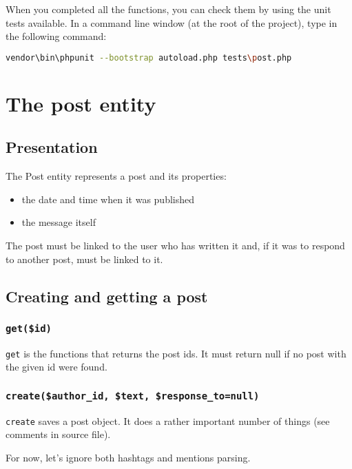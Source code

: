 \documentclass[twoside,a4paper,12pt]{article}
\begin{document}
When you completed all the functions, you can check them by using the unit tests available. In a command line window (at the root of the project), type in the following command:

\begin{lstlisting}[language=bash]
vendor\bin\phpunit --bootstrap autoload.php tests\post.php
\end{lstlisting}

\section{The post entity}

\subsection{Presentation}

The Post entity represents a post and its properties:

\begin{itemize}
\item the date and time when it was published
\item the message itself
\end{itemize}

The post must be linked to the user who has written it and, if it was to respond to another post, must be linked to it.

\subsection{Creating and getting a post}

\subsubsection{\texttt{get(\$id)}}

\texttt{get} is the functions that returns the post ids. It must return null if no post with the given id were found.

\subsubsection{\texttt{create(\$author\_id, \$text, \$response\_to=null)}}

\texttt{create} saves a post object. It does a rather important number of things (see comments in source file).

For now, let's ignore both hashtags and mentions parsing.
\end{document}
